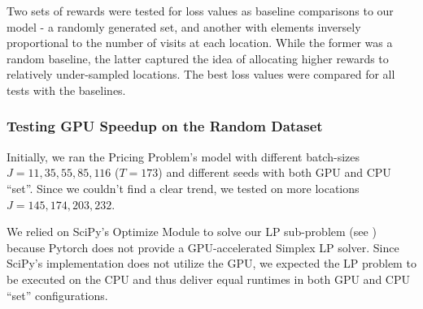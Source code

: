 Two sets of rewards were tested for loss values as baseline comparisons to our model - a randomly generated set, and another with elements inversely proportional to the number of visits at each location. While the former was a random baseline, the latter captured the idea of allocating higher rewards to relatively under-sampled locations. The best loss values were compared for all tests with the baselines.

\subsubsection{Testing GPU Speedup on the Random Dataset} \label{sec:Pricing Problem-Testing GPU Speedup on the Random Dataset}
Initially, we ran the Pricing Problem's model with different batch-sizes $J = 11, 35, 55, 85, 116$ ($T = 173$) and different seeds with both GPU and CPU ``set''. Since we couldn't find a clear trend, we tested on more locations $J = 145, 174, 203, 232$.

We relied on SciPy's Optimize Module to solve our LP sub-problem (see ) because Pytorch does not provide a GPU-accelerated Simplex LP solver. Since SciPy's implementation does not utilize the GPU, we expected the LP problem to be executed on the CPU and thus deliver equal runtimes in both GPU and CPU ``set'' configurations.